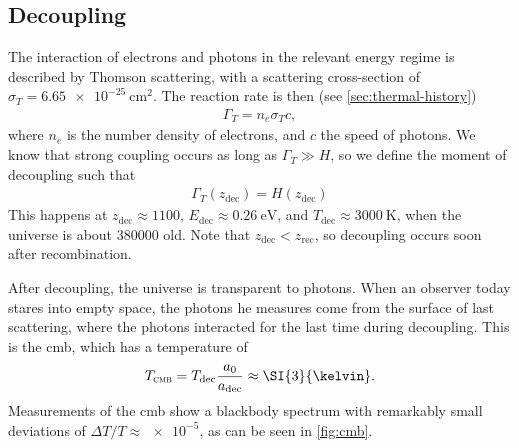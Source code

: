 \subsection{Decoupling}

The interaction of electrons and photons in the relevant energy regime is described by Thomson scattering, with a scattering cross-section of $\sigma_T = \SI{6.65e-25}{\cm\squared}$. The reaction rate is then (see \cref{sec:thermal-history})
\begin{align*}
	\Gamma_T = n_e \sigma_T c,
\end{align*}
where $n_e$ is the number density of electrons, and $c$ the speed of photons. We know that strong coupling occurs as long as $\Gamma_T \gg H$, so we define the moment of decoupling such that
\begin{align*}
	\Gamma_T(z_\text{dec}) = H(z_\text{dec})
\end{align*}
This happens at $z_\text{dec} \approx 1100$, $E_\text{dec} \approx \SI{0.26}{\eV}$, and $T_\text{dec} \approx \SI{3000}{\kelvin}$, when the universe is about \SI{380000}{\year} old. Note that $z_\text{dec} < z_\text{rec}$, so decoupling occurs soon after recombination.

After decoupling, the universe is transparent to photons. When an observer today stares into empty space, the photons he measures come from the surface of last scattering, where the photons interacted for the last time during decoupling.
This is the \ac{cmb}, which has a temperature of
\begin{align*}
	T_\textsc{cmb} = T_\text{dec}\frac{a_0}{a_\text{dec}}
	\approx \SI{3}{\kelvin}.
\end{align*}
Measurements of the \ac{cmb} show a blackbody spectrum with remarkably small deviations of $\Delta T / T \approx \num{e-5}$, as can be seen in \cref{fig:cmb}.

